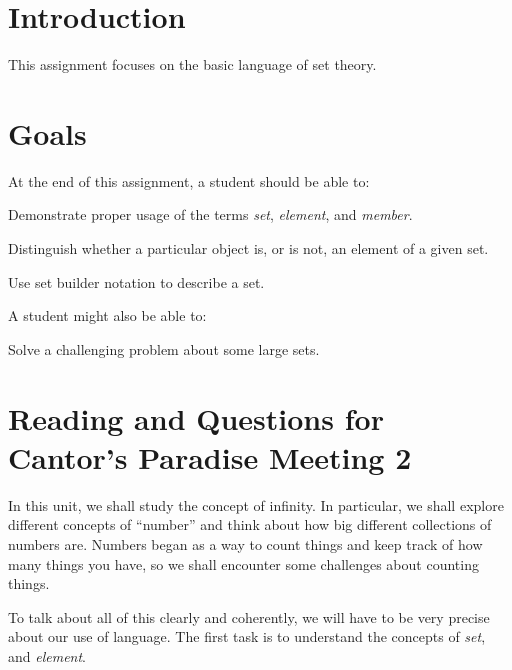 \documentclass[12pt,letterpaper]{article}
\theoremstyle{definition}
\begin{document}
\setlength{\parskip}{1ex plus 0.5ex minus 0.2ex}
\setlength{\parindent}{0pt}

\pagestyle{fancy}
\cfoot{}

\section*{Introduction}
This assignment focuses on the basic language of set theory.

\section*{Goals}
At the end of this assignment, a student should be able to:
\begin{compactitem}
\item Demonstrate proper usage of the terms \emph{set}, \emph{element}, and \emph{member}.
\item Distinguish whether a particular object is, or is not, an element of a given set.
\item Use set builder notation to describe a set.
\end{compactitem}
A student might also be able to:
\begin{compactitem}
\item Solve a challenging problem about some large sets.
\end{compactitem}

\section*{Reading and Questions for Cantor's Paradise Meeting 2}

In this unit, we shall study the concept of infinity. 
In particular, we shall explore different concepts of ``number'' and think about how big different collections of numbers are. 
Numbers began as a way to count things and keep track of how many things you have, so we shall encounter some challenges about counting things.

To talk about all of this clearly and coherently, we will have to be very precise about our use of language.
The first task is to understand the concepts of \emph{set}, and \emph{element}.
\end{document}
